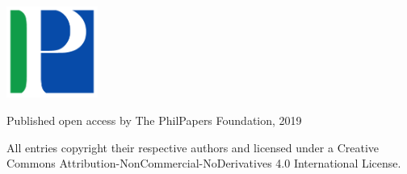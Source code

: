     \begin{center}
        \large

        \hfill

        \vfill

        \begingroup
            \color{Maroon}\spacedallcaps{\myTitle} \\ \bigskip
        \endgroup

        \textls[120]{\scshape \myName}

        \vfill

        \includegraphics[width=3cm]{PhilPapers} \\ \medskip


        Published open access by The PhilPapers Foundation, 2019
        
        \vfill

        {\small All entries copyright \textcopyright\xspace their respective authors and licensed under a Creative 
        Commons Attribution-NonCommercial-NoDerivatives 4.0 International License.}

        \vfill

    \thispagestyle{empty}
    \end{center}
